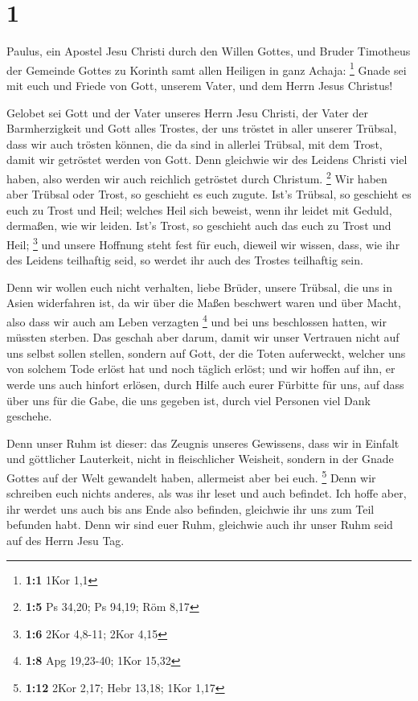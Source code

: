 \hypertarget{section}{%
\section{1}\label{section}}

 Paulus, ein Apostel Jesu Christi durch den Willen Gottes,
und Bruder Timotheus der Gemeinde Gottes zu Korinth samt allen Heiligen
in ganz Achaja: \footnote{\textbf{1:1} 1Kor 1,1}  Gnade sei
mit euch und Friede von Gott, unserem Vater, und dem Herrn Jesus
Christus!

 Gelobet sei Gott und der Vater unseres Herrn Jesu Christi,
der Vater der Barmherzigkeit und Gott alles Trostes,  der
uns tröstet in aller unserer Trübsal, dass wir auch trösten können, die
da sind in allerlei Trübsal, mit dem Trost, damit wir getröstet werden
von Gott.  Denn gleichwie wir des Leidens Christi viel
haben, also werden wir auch reichlich getröstet durch Christum.
\footnote{\textbf{1:5} Ps 34,20; Ps 94,19; Röm 8,17}  Wir
haben aber Trübsal oder Trost, so geschieht es euch zugute. Ist's
Trübsal, so geschieht es euch zu Trost und Heil; welches Heil sich
beweist, wenn ihr leidet mit Geduld, dermaßen, wie wir leiden. Ist's
Trost, so geschieht auch das euch zu Trost und Heil; \footnote{\textbf{1:6}
  2Kor 4,8-11; 2Kor 4,15}  und unsere Hoffnung steht fest
für euch, dieweil wir wissen, dass, wie ihr des Leidens teilhaftig seid,
so werdet ihr auch des Trostes teilhaftig sein.

 Denn wir wollen euch nicht verhalten, liebe Brüder, unsere
Trübsal, die uns in Asien widerfahren ist, da wir über die Maßen
beschwert waren und über Macht, also dass wir auch am Leben verzagten
\footnote{\textbf{1:8} Apg 19,23-40; 1Kor 15,32}  und bei
uns beschlossen hatten, wir müssten sterben. Das geschah aber darum,
damit wir unser Vertrauen nicht auf uns selbst sollen stellen, sondern
auf Gott, der die Toten auferweckt,  welcher uns von
solchem Tode erlöst hat und noch täglich erlöst; und wir hoffen auf ihn,
er werde uns auch hinfort erlösen,  durch Hilfe auch eurer
Fürbitte für uns, auf dass über uns für die Gabe, die uns gegeben ist,
durch viel Personen viel Dank geschehe.

 Denn unser Ruhm ist dieser: das Zeugnis unseres Gewissens,
dass wir in Einfalt und göttlicher Lauterkeit, nicht in fleischlicher
Weisheit, sondern in der Gnade Gottes auf der Welt gewandelt haben,
allermeist aber bei euch. \footnote{\textbf{1:12} 2Kor 2,17; Hebr 13,18;
  1Kor 1,17}  Denn wir schreiben euch nichts anderes, als
was ihr leset und auch befindet. Ich hoffe aber, ihr werdet uns auch bis
ans Ende also befinden, gleichwie ihr uns zum Teil befunden habt.
 Denn wir sind euer Ruhm, gleichwie auch ihr unser Ruhm
seid auf des Herrn Jesu Tag.

